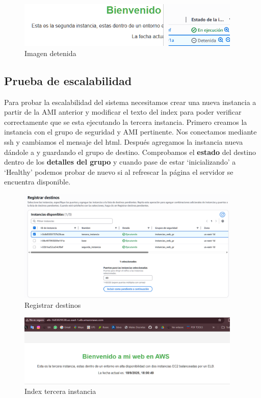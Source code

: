 \documentclass{article}
\begin{document}
	\begin{figure}[H]
	\centering
	\includegraphics[width=0.95\textwidth]{imagen_detenida.png}
	\caption{Imagen detenida}
	\end{figure}

\newpage

\subsection{Prueba de escalabilidad}

	Para probar la escalabilidad del sistema necesitamos crear una nueva instancia a partir de la AMI anterior y modificar el texto del index para poder verificar correctamente que se esta ejecutando la tercera instancia. Primero creamos la instancia con el grupo de seguridad y AMI pertinente. Nos conectamos mediante ssh y cambiamos el mensaje del html. Después agregamos la instancia nueva dándole a  y guardando el grupo de destino. Comprobamos el \textbf{estado} del destino dentro de los \textbf{detalles del grupo} y cuando pase de estar `inicializando' a `Healthy' podemos probar de nuevo si al refrescar la página el servidor se encuentra disponible.


	\begin{figure}[H]
	\centering
	\includegraphics[width=0.95\textwidth]{registrar_destinos.png}
	\caption{Registrar destinos}
	\end{figure}

	\begin{figure}[H]
	\centering
	\includegraphics[width=0.95\textwidth]{tercera_instancia_disponible.png}
	\caption{Index tercera instancia}
	\end{figure}

	
\end{document}
